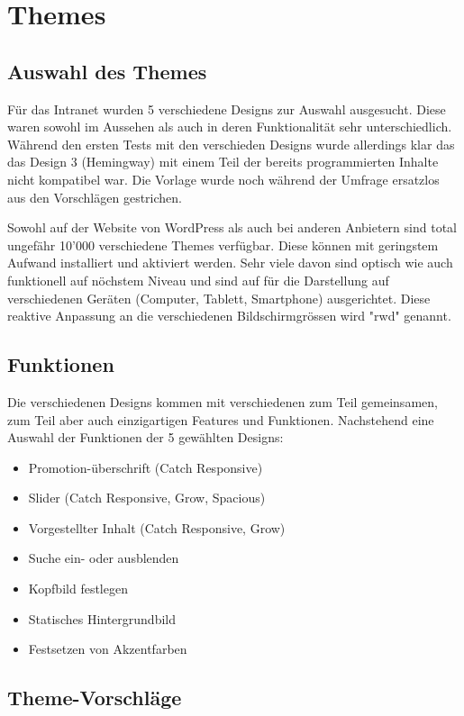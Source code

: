 \documentclass[a4paper,11pt,twoside,titlepage,openright]{report}
\numberwithin{equation}{section}		%
\numberwithin{figure}{section}			%
\numberwithin{table}{section}				%
\begin{document}
\chapter{Themes}
\section{Auswahl des Themes}
Für das Intranet wurden 5 verschiedene Designs zur Auswahl ausgesucht. Diese waren sowohl im Aussehen als auch in deren Funktionalität sehr unterschiedlich. Während den ersten Tests mit den verschieden Designs wurde allerdings klar das das Design 3 (Hemingway) mit einem Teil der bereits programmierten Inhalte nicht kompatibel war. Die Vorlage wurde noch während der Umfrage ersatzlos aus den Vorschlägen gestrichen.

Sowohl auf der Website von WordPress als auch bei anderen Anbietern sind total ungefähr 10'000 verschiedene Themes verfügbar. Diese können mit geringstem Aufwand installiert und aktiviert werden. Sehr viele davon sind optisch wie auch funktionell auf nöchstem Niveau und sind auf für die Darstellung auf verschiedenen Geräten (Computer, Tablett, Smartphone) ausgerichtet. Diese reaktive Anpassung an die verschiedenen Bildschirmgrössen wird "\gls{rwd}" genannt.
\newpage

\section{Funktionen}

Die verschiedenen Designs kommen mit verschiedenen zum Teil gemeinsamen, zum Teil aber auch einzigartigen Features und Funktionen. Nachstehend eine Auswahl der Funktionen der 5 gewählten Designs:

\begin{itemize}
\item Promotion-überschrift (Catch Responsive)
\item Slider (Catch Responsive, Grow, Spacious)
\item Vorgestellter Inhalt (Catch Responsive, Grow)
\item Suche ein- oder ausblenden
\item Kopfbild festlegen
\item Statisches Hintergrundbild
\item Festsetzen von Akzentfarben
\end{itemize}

\section{Theme-Vorschläge}
\end{document}

